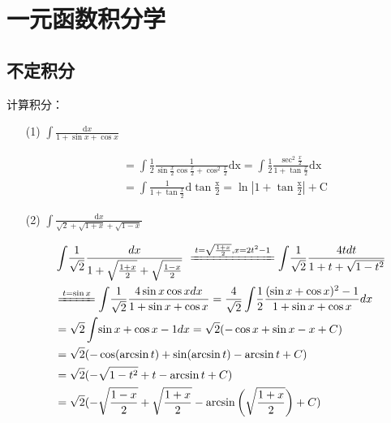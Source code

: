 

\chapter{一元函数积分学}\label{cha:3}
\section{不定积分}
\begin{xiti}
	\item 计算积分：
	\begin{enumerate}
		\item[(1)] $\int \frac {\mathrm{d}x } { 1 + \sin x + \cos x }$
		\begin{solution}
		\begin{align*}	
		&{}=\int \! \frac{1}{2}  \frac{1}{\sin \frac{x}{2} \cos \frac{x}{2} +\cos^2 \frac{x}{2} } \mathrm{dx}=\int\!\frac{1}{2} \frac{\sec^2 \frac{x}{2}}{1+\tan \frac{x}{2}} \mathrm{dx}\\
		&{}=\int \frac{1}{1+\tan \frac{x}{2}}\mathrm{d\tan \frac{x}{2}
		=\ln|1+\tan \frac{x}{2}| +C}
	\end{align*}
		\end{solution}
		
		\item[(2)]  $\int \frac { \mathrm { d } x } { \sqrt { 2 } + \sqrt { 1 + x } + \sqrt { 1 - x } }$
		
		\begin{solution}
		\begin{align*}
			&{}\int\! \frac{1}{\sqrt{2}}\frac{dx}{1+ {\sqrt{\frac{1+x}{2}}}+\sqrt{\frac{1-x}{2}}}\
			\xlongequal{t=\sqrt{\frac{1+x}{2}},x=2t^2-1 }\int\! \frac{1}{\sqrt{2}} \frac{4t dt } { 1+t+\sqrt{1-t^2} }\\
			&{}\xlongequal{t=\sin x}\int\! \frac{1}{\sqrt{2}}\frac{4\sin x \cos x dx }{1+\sin x +\cos x}= \frac{4}{\sqrt{2}}\int\!\frac{1}{2}\frac{(\sin x+\cos x)^2-1}{1+\sin x+\cos x }dx\\
			&{}=\sqrt{2}\int\!\sin x+\cos x-1dx= \sqrt{2}(-\cos x+\sin x-x +C)\\
			&{}=\sqrt{2}(-\cos (\arcsin t)+\sin (\arcsin t)- \arcsin t+C)\\
			&{}=\sqrt{2}(-\sqrt{1-t^2}+t-\arcsin t+C)\\
			&{}=\sqrt{2}( -\sqrt{\frac{1-x}{2}}+\sqrt{\frac{1+x}{2}}-\arcsin \bigg(\sqrt{\frac{1+x}{2}}\bigg)+C )	
		\end{align*}
		\end{solution}


\end{enumerate}
\end{xiti}
